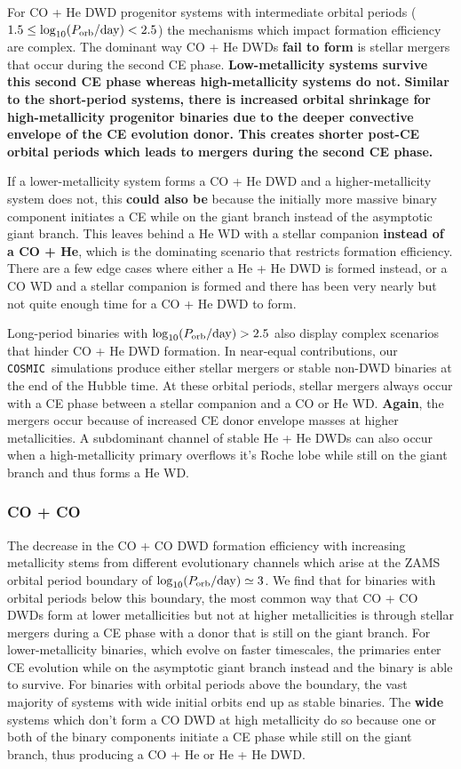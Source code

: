 \documentclass[twocolumn]{aastex631}
\newcommand{\cosmic}{\texttt{COSMIC}}
\begin{document}
For CO + He DWD progenitor systems with intermediate orbital periods ($1.5\leq \log_{10}(P_{\rm{orb}}/\rm{day})< 2.5$) the mechanisms which impact formation efficiency are complex. The dominant way CO + He DWDs \textbf{fail to form} is stellar mergers that occur during the second CE phase. \textbf{Low-metallicity systems survive this second CE phase whereas high-metallicity systems do not.} \textbf{Similar to the short-period systems, there is increased orbital shrinkage for high-metallicity progenitor binaries due to the deeper convective envelope of the CE evolution donor. This creates shorter post-CE orbital periods which leads to mergers during the second \textbf{CE} phase.}

If a lower-metallicity system forms a CO + He DWD and a higher-metallicity system does not, this \textbf{could also be} because the initially more massive binary component initiates a CE while on the giant branch instead of the asymptotic giant branch. This leaves behind a He WD with a stellar companion \textbf{instead of a CO + He}, which is the dominating scenario that restricts formation efficiency. There are a few edge cases where either a He + He DWD is formed instead, or a CO WD and a stellar companion is formed and there has been very nearly but not quite enough time for a CO + He DWD to form. 

Long-period binaries with $\log_{10}(P_{\rm{orb}}/\rm{day})>2.5$ also display complex scenarios that hinder CO + He DWD formation. In near-equal contributions, our \cosmic\ simulations produce either stellar mergers or stable non-DWD binaries at the end of the Hubble time. At these orbital periods, stellar mergers always occur with a CE phase between a stellar companion and a CO or He WD. \textbf{Again}, the mergers occur because of increased CE donor envelope masses at higher metallicities. A subdominant channel of stable He + He DWDs can also occur when a high-metallicity primary overflows it's Roche lobe while still on the giant branch and thus forms a He WD.

\subsubsection{\textbf{CO + CO}}\label{formeff_COCO}
The decrease in the CO + CO DWD formation efficiency with increasing metallicity stems from different evolutionary channels which arise at the ZAMS orbital period boundary of $\log_{10}(P_{\rm{orb}}/\rm{day})\simeq3$. We find that for binaries with orbital periods below this boundary, the most common way that CO + CO DWDs form at lower metallicities but not at higher metallicities is through stellar mergers during a CE phase with a donor that is still on the giant branch. For lower-metallicity binaries, which evolve on faster timescales, the primaries enter CE evolution while on the asymptotic giant branch instead and the binary is able to survive. For binaries with orbital periods above the boundary, the vast majority of systems with wide initial orbits end up as stable binaries. The \textbf{wide} systems which don’t form a CO DWD at high metallicity do so because one or both of the binary components initiate a CE phase while still on the giant branch, thus producing a CO + He or He + He DWD. 
\end{document}
